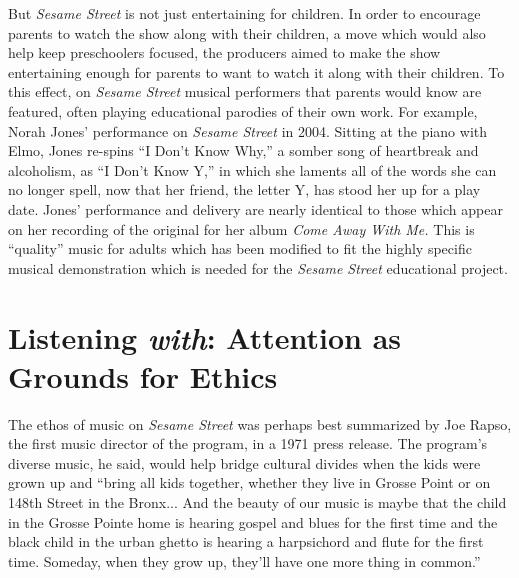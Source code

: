 \documentclass[12pt,letterpaper]{article}
\newcommand{\ses}{\textit{Sesame Street }}
\begin{document}
	But \textit{Sesame Street} is not just entertaining for children. 
	In order to encourage parents to watch the show along with their
	children, a move which would also help keep preschoolers focused,
	the producers aimed to make the show entertaining enough for parents
	to want to watch it along with their children.
	\autocites[294]{Ostrofsky2017}[Mixed-age television targeting likely began on the 
	television program \textit{Captain Kangaroo}.][46]{Davis} 
	To this effect, on \ses musical performers that parents would know are 
	featured, often playing educational parodies 
	of their own work. For example, Norah Jones' performance on \ses in 
	2004.\autocite{4081} Sitting at the piano with Elmo, Jones 
	re-spins ``I Don't Know Why,'' a somber song of heartbreak and 
	alcoholism, as ``I Don't Know Y,'' in which she laments all of the 
	words she can no longer spell, now that her friend, the letter Y, has 
	stood her up for a play date. Jones' performance and delivery are nearly
	identical to those which appear on her recording of the original for her
	album \textit{Come Away With Me.} This is ``quality'' music for adults
	which has been modified to fit the highly specific musical demonstration
	which is needed for the \ses educational project.
		

	\section*{Listening \textit{with}: Attention as Grounds for Ethics}	

	The ethos of music on \textit{Sesame Street} was perhaps best 
	summarized by Joe Rapso, the first music director of the program, in a
	1971 press release. The program's diverse music, he said, would
	help bridge cultural divides when the kids were grown up and ``bring all
	kids together, whether they live in Grosse Point or on 148th Street in 
	the Bronx... And the beauty of our music is maybe that the child in the
	Grosse Pointe home is hearing gospel and blues for the first time and 
	the black child in the urban ghetto is hearing a harpsichord and flute 
	for the first time. Someday, when they grow up, they'll have one more 
	thing in common.''\autocite[297]{Ostrofsky2012}
\end{document}
